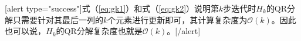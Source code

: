 \documentclass[UTF8,nofonts]{ctexart}
\begin{document}
[alert type="success"]式（\ref{eq:gk1}）和式（\ref{eq:gk2}）说明第$k$步迭代时$H_{k}$的QR分解只需要针对其最后一列的$k$个元素进行更新即可，其计算复杂度为$\mathcal{O}(k)$。因此也可以说，$H_k$的QR分解复杂度也就是$\mathcal{O}(k)$。[/alert]



\let\oldnl\nl
\newcommand{\nonl}{\renewcommand{\nl}{\let\nl\oldnl}}
\begin{algorithm}[H]
\end{algorithm}

\end{document}
